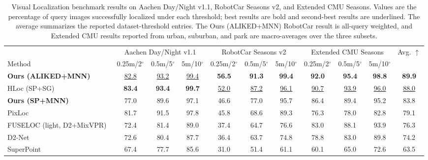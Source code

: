 \documentclass[letterpaper,10 pt,conference]{ieeeconf}
\begin{document}
\begin{table}[!t]
    \centering
    \caption{Visual Localization benchmark results on Aachen Day/Night v1.1, RobotCar Seasons v2, and Extended CMU Seasons. Values are the percentage of query images successfully localized under each threshold; best results are bold and second-best results are underlined. The average summarizes the reported dataset-threshold entries. The Ours (ALIKED+MNN) RobotCar result is all-query weighted, and Extended CMU results reported from urban, suburban, and park are macro-averages over the three subsets.}
    \label{tab:vloc-large-scale-reference}
    \setlength{\tabcolsep}{2.0pt}
    \begin{adjustbox}{max width=\textwidth}
    \begin{tabular}{@{}lcccccccccc@{}}
        \toprule
        & \multicolumn{3}{c}{Aachen Day/Night v1.1} & \multicolumn{3}{c}{RobotCar Seasons v2} & \multicolumn{3}{c}{Extended CMU Seasons} & \multirow{2}{*}{Avg. $\uparrow$} \\
        \cmidrule(lr){2-4}\cmidrule(lr){5-7}\cmidrule(lr){8-10}
        Method & 0.25m/2$^\circ$ & 0.5m/5$^\circ$ & 5m/10$^\circ$ & 0.25m/2$^\circ$ & 0.5m/5$^\circ$ & 5m/10$^\circ$ & 0.25m/2$^\circ$ & 0.5m/5$^\circ$ & 5m/10$^\circ$ & \\
        \midrule
        \textbf{Ours (ALIKED+MNN)} & \underline{82.8} & \underline{93.2} & \underline{99.4} & \textbf{56.5} & \textbf{91.3} & \textbf{99.4} & \textbf{92.0} & \textbf{95.4} & \textbf{98.8} & \textbf{89.9} \\
        HLoc (SP+SG)~\cite{sarlin2019hloc,sarlin2020superglue} & \textbf{83.4} & \textbf{93.4} & \textbf{99.7} & \underline{52.0} & \underline{87.2} & \underline{96.1} & \underline{90.7} & \underline{93.9} & \underline{96.0} & \underline{88.0} \\
        \textbf{Ours (SP+MNN)} & 77.0 & 89.6 & 97.1 & 46.6 & 77.0 & 95.7 & 86.4 & 89.4 & 95.2 & 83.8 \\
        PixLoc~\cite{sarlin2021pixloc} & 81.7 & 91.5 & 97.8 & 45.8 & 68.6 & 89.3 & 76.3 & 78.0 & 82.8 & 79.1 \\
        FUSELOC (light, D2+MixVPR)~\cite{nguyen2024fuseloc} & 72.4 & 81.4 & 89.0 & 37.4 & 64.7 & 76.6 & 83.0 & 88.1 & 93.9 & 76.3 \\
        D2-Net~\cite{dusmanu2019d2net} & 72.6 & 80.4 & 87.7 & 36.4 & 63.7 & 74.8 & 78.8 & 83.0 & 89.8 & 74.2 \\
        SuperPoint~\cite{detone2018superpoint} & 67.4 & 77.7 & 85.6 & 31.0 & 51.4 & 61.1 & 60.1 & 65.0 & 72.6 & 63.5 \\

\end{tabular}
\end{adjustbox}
\end{table}
\end{document}
